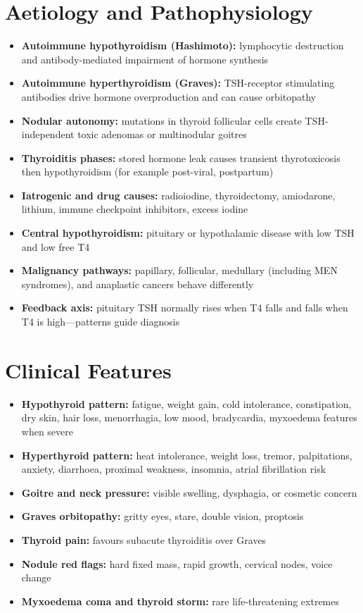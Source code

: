 \section*{Aetiology and Pathophysiology}
\begin{itemize}
    \item \textbf{Autoimmune hypothyroidism (Hashimoto):} lymphocytic destruction and antibody-mediated impairment of hormone synthesis
    \item \textbf{Autoimmune hyperthyroidism (Graves):} TSH-receptor stimulating antibodies drive hormone overproduction and can cause orbitopathy
    \item \textbf{Nodular autonomy:} mutations in thyroid follicular cells create TSH-independent toxic adenomas or multinodular goitres
    \item \textbf{Thyroiditis phases:} stored hormone leak causes transient thyrotoxicosis then hypothyroidism (for example post-viral, postpartum)
    \item \textbf{Iatrogenic and drug causes:} radioiodine, thyroidectomy, amiodarone, lithium, immune checkpoint inhibitors, excess iodine
    \item \textbf{Central hypothyroidism:} pituitary or hypothalamic disease with low TSH and low free T4
    \item \textbf{Malignancy pathways:} papillary, follicular, medullary (including MEN syndromes), and anaplastic cancers behave differently
    \item \textbf{Feedback axis:} pituitary TSH normally rises when T4 falls and falls when T4 is high---patterns guide diagnosis
\end{itemize}

\section*{Clinical Features}
\begin{itemize}
    \item \textbf{Hypothyroid pattern:} fatigue, weight gain, cold intolerance, constipation, dry skin, hair loss, menorrhagia, low mood, bradycardia, myxoedema features when severe
    \item \textbf{Hyperthyroid pattern:} heat intolerance, weight loss, tremor, palpitations, anxiety, diarrhoea, proximal weakness, insomnia, atrial fibrillation risk
    \item \textbf{Goitre and neck pressure:} visible swelling, dysphagia, or cosmetic concern
    \item \textbf{Graves orbitopathy:} gritty eyes, stare, double vision, proptosis
    \item \textbf{Thyroid pain:} favours subacute thyroiditis over Graves
    \item \textbf{Nodule red flags:} hard fixed mass, rapid growth, cervical nodes, voice change
    \item \textbf{Myxoedema coma and thyroid storm:} rare life-threatening extremes
\end{itemize}

